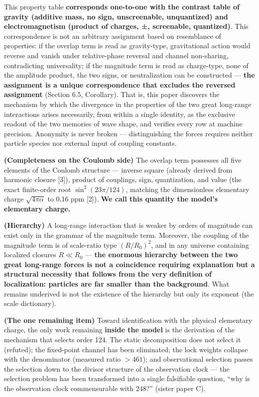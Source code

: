 \documentclass[
  a4paper,
]{article}
\newcounter{none} %
\begin{document}
This property table \textbf{corresponds one-to-one with the contrast
table of gravity (additive mass, no sign, unscreenable, unquantized) and
electromagnetism (product of charges, ±, screenable, quantized)}. This
correspondence is not an arbitrary assignment based on resemblance of
properties: if the overlap term is read as gravity-type, gravitational
action would reverse and vanish under relative-phase reversal and
channel non-sharing, contradicting universality; if the magnitude term
is read as charge-type, none of the amplitude product, the two signs, or
neutralization can be constructed --- \textbf{the assignment is a unique
correspondence that excludes the reversed assignment} (Section 6.5,
Corollary). That is, this paper discovers the mechanism by which the
divergence in the properties of the two great long-range interactions
arises necessarily, from within a single identity, as the exclusive
readout of the two memories of wave shape, and verifies every row at
machine precision. Anonymity is never broken --- distinguishing the
forces requires neither particle species nor external input of coupling
constants.

\textbf{(Completeness on the Coulomb side)} The overlap term possesses
all five elements of the Coulomb structure --- inverse square (already
derived from harmonic closure {[}3{]}), product of couplings, sign,
quantization, and value (the exact finite-order root
\(\sin^2(23\pi/124)\), matching the dimensionless elementary charge
\(\sqrt{4\pi\alpha}\) to 0.16 ppm {[}2{]}). \textbf{We call this
quantity the model's elementary charge.}

\textbf{(Hierarchy)} A long-range interaction that is weaker by orders
of magnitude can exist only in the grammar of the magnitude term.
Moreover, the coupling of the magnitude term is of scale-ratio type
\((R/R_0)^2\), and in any universe containing localized closures
\(R\ll R_0\) --- \textbf{the enormous hierarchy between the two great
long-range forces is not a coincidence requiring explanation but a
structural necessity that follows from the very definition of
localization: particles are far smaller than the background}. What
remains underived is not the existence of the hierarchy but only its
exponent (the scale dictionary).

\textbf{(The one remaining item)} Toward identification with the
physical elementary charge, the only work remaining \textbf{inside the
model} is the derivation of the mechanism that selects order 124. The
static decomposition does not select it (refuted); the fixed-point
channel has been eliminated; the lock weights collapse with the
denominator (measured ratio \(>461\)); and observational selection
passes the selection down to the divisor structure of the observation
clock --- the selection problem has been transformed into a single
falsifiable question, ``why is the observation clock commensurable with
248?'' (sister paper C).
\end{document}
